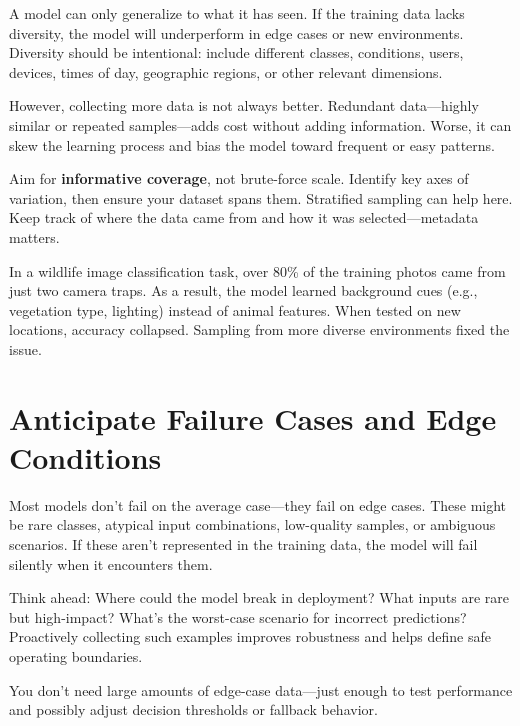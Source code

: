 \documentclass[12pt,openany]{book}
\begin{document}
A model can only generalize to what it has seen. If the training data lacks diversity, the model will underperform in edge cases or new environments. Diversity should be intentional: include different classes, conditions, users, devices, times of day, geographic regions, or other relevant dimensions. \newline

However, collecting more data is not always better. Redundant data—highly similar or repeated samples—adds cost without adding information. Worse, it can skew the learning process and bias the model toward frequent or easy patterns. \newline

Aim for \textbf{informative coverage}, not brute-force scale. Identify key axes of variation, then ensure your dataset spans them. Stratified sampling can help here. Keep track of where the data came from and how it was selected—metadata matters.

\begin{examplebox}
In a wildlife image classification task, over 80\% of the training photos came from just two camera traps. As a result, the model learned background cues (e.g., vegetation type, lighting) instead of animal features. When tested on new locations, accuracy collapsed. Sampling from more diverse environments fixed the issue.
\end{examplebox}



\section{Anticipate Failure Cases and Edge Conditions}

Most models don't fail on the average case—they fail on edge cases. These might be rare classes, atypical input combinations, low-quality samples, or ambiguous scenarios. If these aren't represented in the training data, the model will fail silently when it encounters them. \newline

Think ahead: Where could the model break in deployment? What inputs are rare but high-impact? What’s the worst-case scenario for incorrect predictions? Proactively collecting such examples improves robustness and helps define safe operating boundaries. \newline

You don’t need large amounts of edge-case data—just enough to test performance and possibly adjust decision thresholds or fallback behavior. \newline
\end{document}
